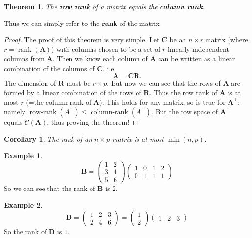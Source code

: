 \documentclass[
]{book}
\newtheorem{theorem}{Theorem}[chapter]
\newtheorem{corollary}{Corollary}[chapter]
\theoremstyle{definition}
\theoremstyle{definition}
\newtheorem{example}{Example}[chapter]
\theoremstyle{definition}
\theoremstyle{definition}
\theoremstyle{remark}
\begin{document}
\begin{theorem}
\protect\hypertarget{thm:rowrank}{}\label{thm:rowrank}The \textbf{row rank} of a matrix equals the \textbf{column rank}.
\end{theorem}

Thus we can simply refer to the \textbf{rank} of the matrix.

\begin{proof}
The proof of this theorem is very simple. Let \(\mathbf C\) be an \(n \times r\) matrix (where \(r=\operatorname{rank}(\mathbf A)\)) with columns chosen to be a set of \(r\) linearly independent columns from \(\mathbf A\). Then we know each column of \(\mathbf A\) can be written as a linear combination of the columns of \(\mathbf C\), i.e.
\[\mathbf A= \mathbf C\mathbf R.\]
The dimension of \(\mathbf R\) must be \(r \times p\). But now we can see that the rows of \(\mathbf A\) are formed by a linear combination of the rows of \(\mathbf R\). Thus the row rank of \(\mathbf A\) is at most \(r\) (=the column rank of \(\mathbf A\)). This holds for any matrix, so is true for \(\mathbf A^\top\): namely \(\operatorname{row-rank}(A^\top)\leq \operatorname{column-rank}(A^\top)\). But the row space of \(\mathbf A^\top\) equals \(\mathcal{C}(\mathbf A)\), thus proving the theorem!
\end{proof}

\begin{corollary}
\protect\hypertarget{cor:unnamed-chunk-1}{}\label{cor:unnamed-chunk-1}The rank of an \(n\times p\) matrix is at most \(\min(n,p)\).
\end{corollary}

\begin{example}
\protect\hypertarget{exm:matrix1}{}\label{exm:matrix1}\[\mathbf B= \left( \begin{array}{cccc} 1 & 2\\ 3&4 \\5&6\end{array}\right)\left(\begin{array}{cccc}1&0&1&2\\0&1&1&1\end{array}\right)
\]
So we can see that the rank of \(\mathbf B\) is 2.
\end{example}

\begin{example}
\protect\hypertarget{exm:matrix2}{}\label{exm:matrix2}\[ \mathbf D=\left( \begin{array}{ccc} 1 & 2&3\\ 2&4&6 \end{array}\right)= \left( \begin{array}{c} 1 \\ 2 \end{array}\right)\left(\begin{array}{ccc}1&2&3\end{array}\right)
\]
So the rank of \(\mathbf D\) is \(1\).
\end{example}
\end{document}
